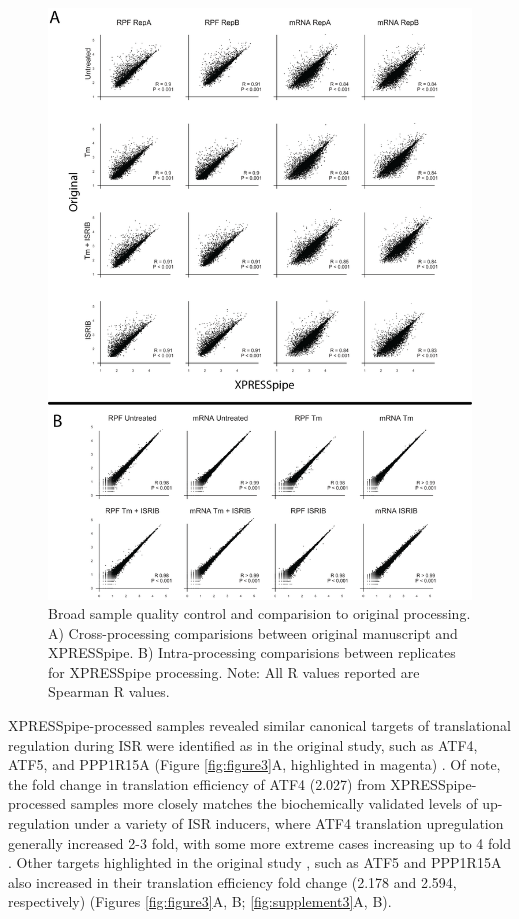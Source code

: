 \documentclass[11pt, a4paper, oneside]{article}
\begin{document}
\begin{figure}
\centering
  \includegraphics[width=160mm]{figures/xpresspipe_figure2.png}
  \caption{Broad sample quality control and comparision to original processing. A) Cross-processing comparisions between original manuscript and XPRESSpipe. B) Intra-processing comparisions between replicates for XPRESSpipe processing. Note: All R values reported are Spearman R values.}
  \label{fig:figure2}
\end{figure}

XPRESSpipe-processed samples revealed similar canonical targets of translational regulation during ISR were identified as in the original study, such as ATF4, ATF5, and PPP1R15A (Figure \ref{fig:figure3}A, highlighted in magenta) \cite{isrib_riboseq}. Of note, the fold change in translation efficiency of ATF4 (2.027) from XPRESSpipe-processed samples more closely matches the biochemically validated levels of up-regulation under a variety of ISR inducers, where ATF4 translation upregulation generally increased 2-3 fold, with some more extreme cases increasing up to 4 fold \cite{atf4_translation}. Other targets highlighted in the original study \cite{isrib_riboseq}, such as ATF5 and PPP1R15A also increased in their  translation efficiency fold change (2.178 and 2.594, respectively) (Figures \ref{fig:figure3}A, B; \ref{fig:supplement3}A, B).  \par
\end{document}
